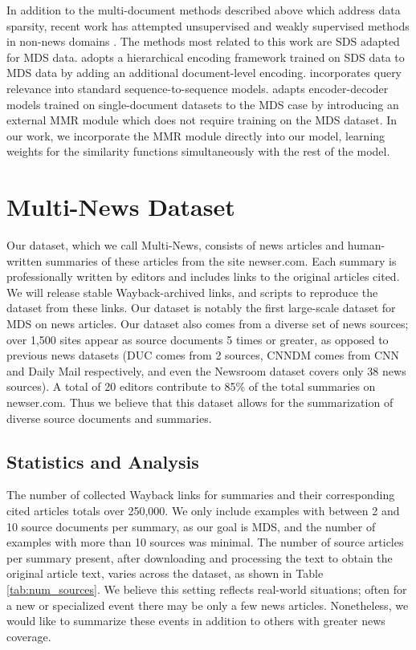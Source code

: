 \documentclass[11pt,a4paper]{article}
\begin{document}
In addition to the multi-document methods described above which address data sparsity, recent work has attempted unsupervised and weakly supervised methods in non-news domains \cite{liu18unsupervised, angelidis18opinions}. The methods most related to this work are SDS adapted for MDS data. 
 adopts a hierarchical encoding framework trained on SDS data to MDS data by adding an additional document-level encoding.  incorporates query relevance into standard sequence-to-sequence models.  adapts encoder-decoder models trained on single-document datasets to the MDS case by introducing an external MMR module which does not require training on the MDS dataset. In our work, we incorporate the MMR module directly into our model, learning weights for the similarity functions simultaneously with the rest of the model.
\section{Multi-News Dataset}
Our dataset, which we call Multi-News, consists of news articles and human-written summaries of these articles from the site newser.com. Each summary is professionally written by editors and includes links to the original articles cited. We will release stable Wayback-archived links, and scripts to reproduce the dataset from these links. Our dataset is notably the first large-scale dataset for MDS on news articles. Our dataset also comes from a diverse set of news sources; over 1,500 sites appear as source documents 5 times or greater, as opposed to previous news datasets (DUC comes from 2 sources, CNNDM comes from CNN and Daily Mail respectively, and even the Newsroom dataset \cite{Grusky:18} covers only 38 news sources). A total of 20 editors contribute to 85\% of the total summaries on newser.com. Thus we believe that this dataset allows for the summarization of diverse source documents and summaries.  


\subsection{Statistics and Analysis}
The number of collected Wayback links for summaries and their corresponding cited articles totals over 250,000. We only include examples with between 2 and 10 source documents per summary, as our goal is MDS, and the number of examples with more than 10 sources was minimal. The number of source articles per summary present, after downloading and processing the text to obtain the original article text, varies across the dataset, as shown in Table \ref{tab:num_sources}. We believe this setting reflects real-world situations; often for a new or specialized event there may be only a few news articles. Nonetheless, we would like to summarize these events in addition to others with greater news coverage. 
\end{document}
